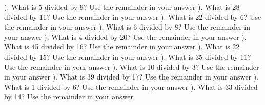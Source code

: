 \documentclass{article}%
\begin{document}
\newline%
\newline%
). What is 5 divided by 9? Use the remainder in your answer%
\newline%
\newline%
). What is 28 divided by 11? Use the remainder in your answer%
\newline%
\newline%
). What is 22 divided by 6? Use the remainder in your answer%
\newline%
\newline%
). What is 6 divided by 8? Use the remainder in your answer%
\newline%
\newline%
). What is 4 divided by 20? Use the remainder in your answer%
\newline%
\newline%
). What is 45 divided by 16? Use the remainder in your answer%
\newline%
\newline%
). What is 22 divided by 15? Use the remainder in your answer%
\newline%
\newline%
). What is 35 divided by 11? Use the remainder in your answer%
\newline%
\newline%
). What is 10 divided by 3? Use the remainder in your answer%
\newline%
\newline%
). What is 39 divided by 17? Use the remainder in your answer%
\newline%
\newline%
). What is 1 divided by 6? Use the remainder in your answer%
\newline%
\newline%
). What is 33 divided by 14? Use the remainder in your answer%
\newline%
\end{document}
